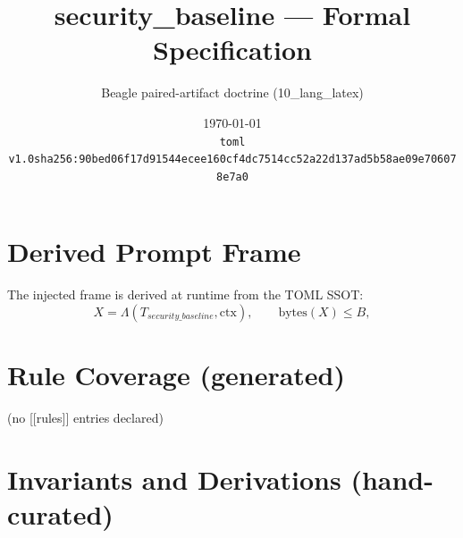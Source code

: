 \documentclass[11pt]{article}
\title{security\_baseline --- Formal Specification}
\author{Beagle paired-artifact doctrine (10\_lang\_latex)}
\date{\today\\ \texttt{toml v1.0\quad sha256:90bed06f17d91544ecee160cf4dc7514cc52a22d137ad5b58ae09e706078e7a0}}
\begin{document}
\maketitle

\section{Derived Prompt Frame}
The injected frame is derived at runtime from the TOML SSOT:
\begin{equation}
  X = \Lambda(T_{security\_baseline}, \mathrm{ctx}), \qquad \mathrm{bytes}(X) \le B,
  \label{lbl:derive-frame}
\end{equation}

\section{Rule Coverage (generated)}
(no [[rules]] entries declared)

\section{Invariants and Derivations (hand-curated)}
\end{document}
